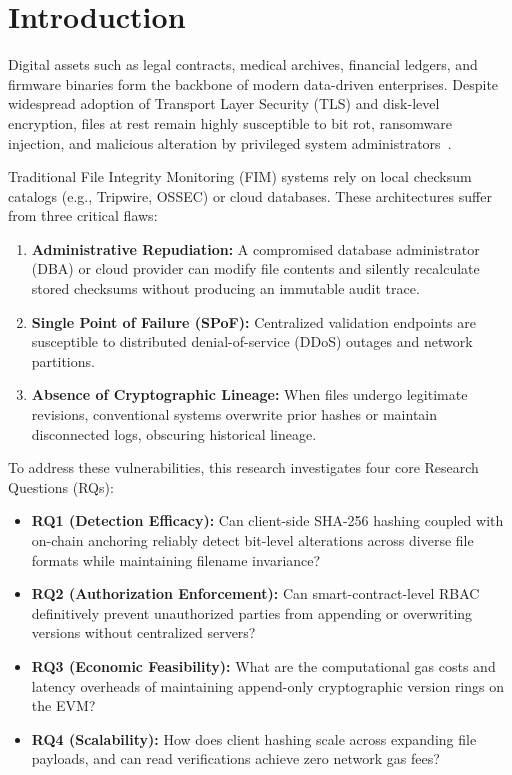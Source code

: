 \documentclass[10pt,conference,letterpaper]{IEEEtran}
\begin{document}
\section{Introduction}
Digital assets such as legal contracts, medical archives, financial ledgers, and firmware binaries form the backbone of modern data-driven enterprises. Despite widespread adoption of Transport Layer Security (TLS) and disk-level encryption, files at rest remain highly susceptible to bit rot, ransomware injection, and malicious alteration by privileged system administrators~\cite{puthal2018}.

Traditional File Integrity Monitoring (FIM) systems rely on local checksum catalogs (e.g., Tripwire, OSSEC) or cloud databases. These architectures suffer from three critical flaws:
\begin{enumerate}
    \item \textbf{Administrative Repudiation:} A compromised database administrator (DBA) or cloud provider can modify file contents and silently recalculate stored checksums without producing an immutable audit trace.
    \item \textbf{Single Point of Failure (SPoF):} Centralized validation endpoints are susceptible to distributed denial-of-service (DDoS) outages and network partitions.
    \item \textbf{Absence of Cryptographic Lineage:} When files undergo legitimate revisions, conventional systems overwrite prior hashes or maintain disconnected logs, obscuring historical lineage.
\end{enumerate}

To address these vulnerabilities, this research investigates four core Research Questions (RQs):
\begin{itemize}
    \item \textbf{RQ1 (Detection Efficacy):} Can client-side SHA-256 hashing coupled with on-chain anchoring reliably detect bit-level alterations across diverse file formats while maintaining filename invariance?
    \item \textbf{RQ2 (Authorization Enforcement):} Can smart-contract-level RBAC definitively prevent unauthorized parties from appending or overwriting versions without centralized servers?
    \item \textbf{RQ3 (Economic Feasibility):} What are the computational gas costs and latency overheads of maintaining append-only cryptographic version rings on the EVM?
    \item \textbf{RQ4 (Scalability):} How does client hashing scale across expanding file payloads, and can read verifications achieve zero network gas fees?
\end{itemize}
\end{document}
